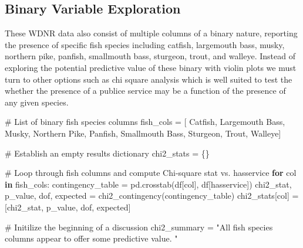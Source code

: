 \documentclass[
]{article}
\newenvironment{Shaded}{\begin{snugshade}}{\end{snugshade}}
\newcommand{\CommentTok}[1]{\textcolor[rgb]{0.37,0.37,0.37}{#1}}
\newcommand{\ControlFlowTok}[1]{\textcolor[rgb]{0.00,0.23,0.31}{\textbf{#1}}}
\newcommand{\KeywordTok}[1]{\textcolor[rgb]{0.00,0.23,0.31}{\textbf{#1}}}
\newcommand{\NormalTok}[1]{\textcolor[rgb]{0.00,0.23,0.31}{#1}}
\newcommand{\OperatorTok}[1]{\textcolor[rgb]{0.37,0.37,0.37}{#1}}
\newcommand{\StringTok}[1]{\textcolor[rgb]{0.13,0.47,0.30}{#1}}
\begin{document}
\subsection{Binary Variable
Exploration}\label{binary-variable-exploration}

These WDNR data also consist of multiple columns of a binary nature,
reporting the presence of specific fish species including catfish,
largemouth bass, musky, northern pike, panfish, smallmouth bass,
sturgeon, trout, and walleye. Instead of exploring the potential
predictive value of these binary with violin plots we must turn to other
options such as chi square analysis which is well suited to test the
whether the presence of a publice service may be a function of the
presence of any given species.

\begin{Shaded}
\begin{Highlighting}[]
\CommentTok{\# List of binary fish species columns}
\NormalTok{fish\_cols }\OperatorTok{=}\NormalTok{ [}
    \StringTok{\textquotesingle{}Catfish\textquotesingle{}}\NormalTok{, }\StringTok{\textquotesingle{}Largemouth Bass\textquotesingle{}}\NormalTok{, }\StringTok{\textquotesingle{}Musky\textquotesingle{}}\NormalTok{,}
    \StringTok{\textquotesingle{}Northern Pike\textquotesingle{}}\NormalTok{, }\StringTok{\textquotesingle{}Panfish\textquotesingle{}}\NormalTok{, }\StringTok{\textquotesingle{}Smallmouth Bass\textquotesingle{}}\NormalTok{,}
    \StringTok{\textquotesingle{}Sturgeon\textquotesingle{}}\NormalTok{, }\StringTok{\textquotesingle{}Trout\textquotesingle{}}\NormalTok{, }\StringTok{\textquotesingle{}Walleye\textquotesingle{}}\NormalTok{]}

\CommentTok{\# Establish an empty results dictionary}
\NormalTok{chi2\_stats }\OperatorTok{=}\NormalTok{ \{\}}

\CommentTok{\# Loop through fish columns and compute Chi{-}square stat vs. hasservice}
\ControlFlowTok{for}\NormalTok{ col }\KeywordTok{in}\NormalTok{ fish\_cols:}
\NormalTok{    contingency\_table }\OperatorTok{=}\NormalTok{ pd.crosstab(df[col], df[}\StringTok{\textquotesingle{}hasservice\textquotesingle{}}\NormalTok{])}
\NormalTok{    chi2\_stat, p\_value, dof, expected }\OperatorTok{=}\NormalTok{ chi2\_contingency(contingency\_table)}
\NormalTok{    chi2\_stats[col] }\OperatorTok{=}\NormalTok{ [chi2\_stat, p\_value, dof, expected]}

\CommentTok{\# Initilize the beginning of a discussion}
\NormalTok{chi2\_summary }\OperatorTok{=} \StringTok{"All fish species columns appear to offer some predictive value. "}


\end{Highlighting}
\end{Shaded}
\end{document}
